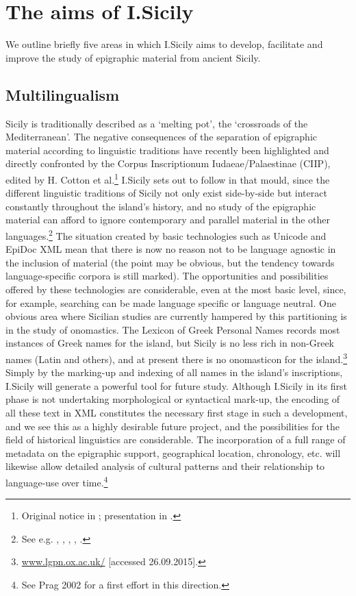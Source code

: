 \documentclass[amsthm,ebook]{saparticle}
\begin{document}
\section{The aims of I.Sicily}


We outline briefly five areas in which I.Sicily aims to develop, facilitate and improve the study of epigraphic material
from ancient Sicily.




\subsection{Multilingualism}


Sicily is traditionally described as a `melting pot', the `crossroads of the Mediterranean'. The negative consequences
of the separation of epigraphic material according to linguistic traditions have recently been highlighted and directly
confronted by the Corpus Inscriptionum Iudaeae/Palaestinae (CIIP), edited by H. Cotton et al.\footnote{ Original notice
in \citet{cotton_corpus_1999}; presentation in \citet{cotton_corpus_2010}.} I.Sicily sets out to follow in that mould, since the
different linguistic traditions of Sicily not only exist side-by-side but interact constantly throughout the island’s
history, and no study of the epigraphic material can afford to ignore contemporary and parallel material in the other
languages.\footnote{ See e.g. \citet{manganaro_greco_1993}, \citet{prag_epigraphy_2002}, \citet{salmeri_i_2004}, \citet{korhonen_language_2011}, \citet{tribulato_language_2012}.} The situation
created by basic technologies such as Unicode and EpiDoc XML mean that there is now no reason not to be language
agnostic in the inclusion of material (the point may be obvious, but the tendency towards language-specific corpora is
still marked). The opportunities and possibilities offered by these technologies are considerable, even at the most
basic level, since, for example, searching can be made language specific or language neutral. One obvious area where
Sicilian studies are currently hampered by this partitioning is in the study of onomastics. The Lexicon of Greek
Personal Names records most instances of Greek names for the island, but Sicily is no less rich in non-Greek names
(Latin and others), and at present there is no onomasticon for the island.\footnote{ \url{www.lgpn.ox.ac.uk/} [accessed
26.09.2015].} Simply by the marking-up and indexing of all names in the island’s inscriptions, I.Sicily will generate a
powerful tool for future study. Although I.Sicily in its first phase is not undertaking morphological or syntactical
mark-up, the encoding of all these text in XML constitutes the necessary first stage in such a development, and we see
this as a highly desirable future project, and the possibilities for the field of historical linguistics are
considerable. The incorporation of a full range of metadata on the epigraphic support, geographical location,
chronology, etc. will likewise allow detailed analysis of cultural patterns and their relationship to language-use over
time.\footnote{ See Prag 2002 for a first effort in this direction.}
\end{document}
